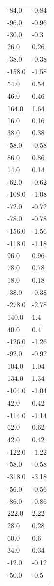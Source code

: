 \begin{longtable}{ll}
-84.0 & -0.84 \\
-96.0 & -0.96 \\
-30.0 & -0.3 \\
26.0 & 0.26 \\
-38.0 & -0.38 \\
-158.0 & -1.58 \\
54.0 & 0.54 \\
46.0 & 0.46 \\
164.0 & 1.64 \\
16.0 & 0.16 \\
38.0 & 0.38 \\
-58.0 & -0.58 \\
86.0 & 0.86 \\
14.0 & 0.14 \\
-62.0 & -0.62 \\
-108.0 & -1.08 \\
-72.0 & -0.72 \\
-78.0 & -0.78 \\
-156.0 & -1.56 \\
-118.0 & -1.18 \\
96.0 & 0.96 \\
78.0 & 0.78 \\
18.0 & 0.18 \\
-38.0 & -0.38 \\
-278.0 & -2.78 \\
140.0 & 1.4 \\
40.0 & 0.4 \\
-126.0 & -1.26 \\
-92.0 & -0.92 \\
104.0 & 1.04 \\
134.0 & 1.34 \\
-104.0 & -1.04 \\
42.0 & 0.42 \\
-114.0 & -1.14 \\
62.0 & 0.62 \\
42.0 & 0.42 \\
-122.0 & -1.22 \\
-58.0 & -0.58 \\
-318.0 & -3.18 \\
-56.0 & -0.56 \\
-86.0 & -0.86 \\
222.0 & 2.22 \\
28.0 & 0.28 \\
60.0 & 0.6 \\
34.0 & 0.34 \\
-12.0 & -0.12 \\
-50.0 & -0.5 \\

\end{longtable}
